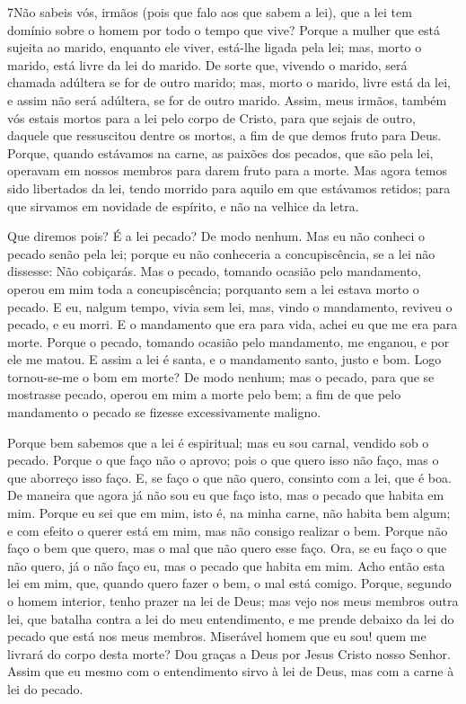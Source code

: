 \medskip

\lettrine{7} Não sabeis vós, irmãos (pois que falo aos que
sabem a lei), que a lei tem domínio sobre o homem por todo o tempo
que vive? Porque a mulher que está sujeita ao marido, enquanto
ele viver, está-lhe ligada pela lei; mas, morto o marido, está livre
da lei do marido. De sorte que, vivendo o marido, será chamada
adúltera se for de outro marido; mas, morto o marido, livre está da
lei, e assim não será adúltera, se for de outro marido. Assim,
meus irmãos, também vós estais mortos para a lei pelo corpo de
Cristo, para que sejais de outro, daquele que ressuscitou dentre os
mortos, a fim de que demos fruto para Deus. Porque, quando
estávamos na carne, as paixões dos pecados, que são pela lei,
operavam em nossos membros para darem fruto para a morte. Mas
agora temos sido libertados da lei, tendo morrido para aquilo em que
estávamos retidos; para que sirvamos em novidade de espírito, e não
na velhice da letra.

Que diremos pois? É a lei pecado? De modo nenhum. Mas eu não
conheci o pecado senão pela lei; porque eu não conheceria a
concupiscência, se a lei não dissesse: Não cobiçarás. Mas o
pecado, tomando ocasião pelo mandamento, operou em mim toda a
concupiscência; porquanto sem a lei estava morto o pecado. E eu,
nalgum tempo, vivia sem lei, mas, vindo o mandamento, reviveu o
pecado, e eu morri. E o mandamento que era para vida, achei
eu que me era para morte. Porque o pecado, tomando ocasião
pelo mandamento, me enganou, e por ele me matou. E assim a
lei é santa, e o mandamento santo, justo e bom. Logo
tornou-se-me o bom em morte? De modo nenhum; mas o pecado, para que
se mostrasse pecado, operou em mim a morte pelo bem; a fim de que
pelo mandamento o pecado se fizesse excessivamente maligno.

Porque bem sabemos que a lei é espiritual; mas eu sou carnal,
vendido sob o pecado. Porque o que faço não o aprovo; pois o
que quero isso não faço, mas o que aborreço isso faço. E, se
faço o que não quero, consinto com a lei, que é boa. De
maneira que agora já não sou eu que faço isto, mas o pecado que
habita em mim. Porque eu sei que em mim, isto é, na minha
carne, não habita bem algum; e com efeito o querer está em mim, mas
não consigo realizar o bem. Porque não faço o bem que quero,
mas o mal que não quero esse faço. Ora, se eu faço o que não
quero, já o não faço eu, mas o pecado que habita em mim. Acho
então esta lei em mim, que, quando quero fazer o bem, o mal está
comigo. Porque, segundo o homem interior, tenho prazer na lei
de Deus; mas vejo nos meus membros outra lei, que batalha
contra a lei do meu entendimento, e me prende debaixo da lei do
pecado que está nos meus membros. Miserável homem que eu sou!
quem me livrará do corpo desta morte? Dou graças a Deus por
Jesus Cristo nosso Senhor. Assim que eu mesmo com o entendimento
sirvo à lei de Deus, mas com a carne à lei do pecado.

